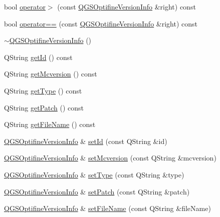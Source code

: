 \begin{DoxyCompactItemize}
\item 
bool \mbox{\hyperlink{class_q_g_s_optifine_version_info_adbc88aa7aebb96d58640c19ce1bb8b11}{operator$>$}} (const \mbox{\hyperlink{class_q_g_s_optifine_version_info}{Q\+G\+S\+Optifine\+Version\+Info}} \&right) const
\item 
bool \mbox{\hyperlink{class_q_g_s_optifine_version_info_acf7e6566d898467299fa07b50953b48b}{operator==}} (const \mbox{\hyperlink{class_q_g_s_optifine_version_info}{Q\+G\+S\+Optifine\+Version\+Info}} \&right) const
\item 
\mbox{\hyperlink{class_q_g_s_optifine_version_info_a5f295b8ebe2c905b6791392dafd87d76}{$\sim$\+Q\+G\+S\+Optifine\+Version\+Info}} ()
\item 
Q\+String \mbox{\hyperlink{class_q_g_s_optifine_version_info_a34e1234ebaea4070af19574885ed7bb3}{get\+Id}} () const
\item 
Q\+String \mbox{\hyperlink{class_q_g_s_optifine_version_info_aeee78255ded0484b09ee30cc5ae4cd3e}{get\+Mcversion}} () const
\item 
Q\+String \mbox{\hyperlink{class_q_g_s_optifine_version_info_ae3553e4d2fba6412369b4efa6cbfbb1f}{get\+Type}} () const
\item 
Q\+String \mbox{\hyperlink{class_q_g_s_optifine_version_info_afbb48edcfd483801facf0cf10eef41a5}{get\+Patch}} () const
\item 
Q\+String \mbox{\hyperlink{class_q_g_s_optifine_version_info_a295ded46b678300698caee411024aff3}{get\+File\+Name}} () const
\item 
\mbox{\hyperlink{class_q_g_s_optifine_version_info}{Q\+G\+S\+Optifine\+Version\+Info}} \& \mbox{\hyperlink{class_q_g_s_optifine_version_info_a7c5be4d3f21248d01e8ee99a788ba668}{set\+Id}} (const Q\+String \&id)
\item 
\mbox{\hyperlink{class_q_g_s_optifine_version_info}{Q\+G\+S\+Optifine\+Version\+Info}} \& \mbox{\hyperlink{class_q_g_s_optifine_version_info_a0571ad70546434e6be37f3f82a252128}{set\+Mcversion}} (const Q\+String \&mcversion)
\item 
\mbox{\hyperlink{class_q_g_s_optifine_version_info}{Q\+G\+S\+Optifine\+Version\+Info}} \& \mbox{\hyperlink{class_q_g_s_optifine_version_info_a0ec800a565f7a2c9d6327aec0a80be66}{set\+Type}} (const Q\+String \&type)
\item 
\mbox{\hyperlink{class_q_g_s_optifine_version_info}{Q\+G\+S\+Optifine\+Version\+Info}} \& \mbox{\hyperlink{class_q_g_s_optifine_version_info_a07b41fc1bc8ec50f0f5c76f265fa41d3}{set\+Patch}} (const Q\+String \&patch)
\item 
\mbox{\hyperlink{class_q_g_s_optifine_version_info}{Q\+G\+S\+Optifine\+Version\+Info}} \& \mbox{\hyperlink{class_q_g_s_optifine_version_info_af8aba5fe23de1b43e6eb596a74da1caf}{set\+File\+Name}} (const Q\+String \&file\+Name)
\end{DoxyCompactItemize}


